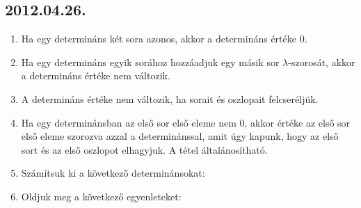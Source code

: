 \subsection*{2012.04.26.}
\begin{enumerate}
\item Ha egy determináns két sora azonos, akkor a determináns értéke 0.
\item Ha egy determináns egyik sorához hozzáadjuk egy másik sor $\lambda$-szorosát, akkor a determináns értéke nem változik.
\item A determináns értéke nem változik, ha sorait és oszlopait felcseréljük.
\item Ha egy determinánsban az első sor első eleme nem 0, akkor értéke az első sor első eleme szorozva azzal a determinánssal, amit úgy kapunk, hogy az első sort és az első oszlopot elhagyjuk. A tétel általánosítható.
\item Számítsuk ki a következő determinánsokat:
\item Oldjuk meg a következő egyenleteket:
\end{enumerate}


